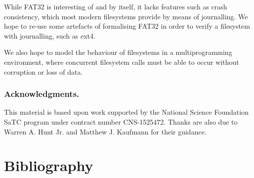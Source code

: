 \documentclass[submission,copyright,creativecommons]{eptcs}
\begin{document}
While FAT32 is interesting of and by itself, it lacks features such as
crash consistency, which most modern filesystems provide by means of
journalling. We hope to re-use some artefacts of formalising FAT32 in
order to verify a filesystem with journalling, such as ext4.

We also hope to model the behaviour of filesystems in a
multiprogramming environment, where concurrent filesystem calls must
be able to occur without corruption or loss of data.

\subsubsection*{Acknowledgments.} This material is based upon work
supported by the National Science Foundation SaTC program under
contract number CNS-1525472. Thanks are also due to Warren A. Hunt
Jr. and Matthew J. Kaufmann for their guidance.

\section{Bibliography}



\end{document}
